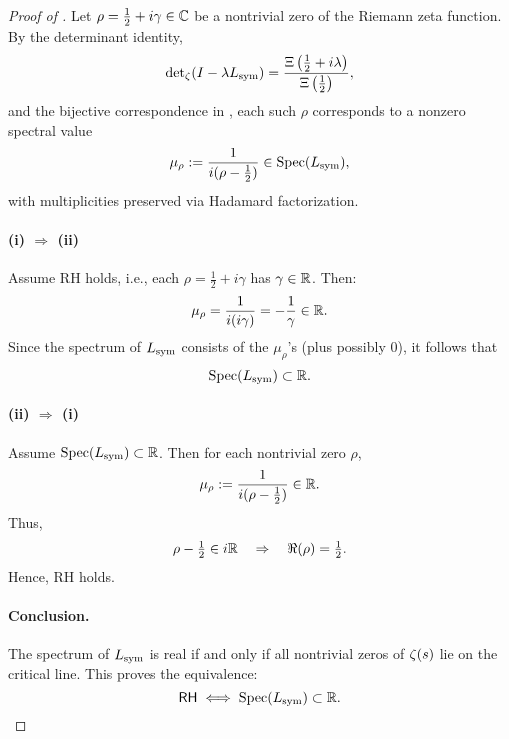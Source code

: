 \begin{proof}[Proof of ]
Let \( \rho = \tfrac{1}{2} + i\gamma \in \mathbb{C} \) be a nontrivial zero of the Riemann zeta function. By the determinant identity,
\[
\det\nolimits_\zeta(I - \lambda L_{\mathrm{sym}}) = \frac{\Xi\left( \tfrac{1}{2} + i\lambda \right)}{\Xi\left( \tfrac{1}{2} \right)},
\]
and the bijective correspondence in , each such \( \rho \) corresponds to a nonzero spectral value
\[
\mu_\rho := \frac{1}{i(\rho - \tfrac{1}{2})} \in \operatorname{Spec}(L_{\mathrm{sym}}),
\]
with multiplicities preserved via Hadamard factorization.

\paragraph{(i) \( \Rightarrow \) (ii)}
Assume RH holds, i.e., each \( \rho = \tfrac{1}{2} + i\gamma \) has \( \gamma \in \mathbb{R} \). Then:
\[
\mu_\rho = \frac{1}{i(i\gamma)} = -\frac{1}{\gamma} \in \mathbb{R}.
\]
Since the spectrum of \( L_{\mathrm{sym}} \) consists of the \( \mu_\rho \)'s (plus possibly 0), it follows that
\[
\operatorname{Spec}(L_{\mathrm{sym}}) \subset \mathbb{R}.
\]

\paragraph{(ii) \( \Rightarrow \) (i)}
Assume \( \operatorname{Spec}(L_{\mathrm{sym}}) \subset \mathbb{R} \). Then for each nontrivial zero \( \rho \),
\[
\mu_\rho := \frac{1}{i(\rho - \tfrac{1}{2})} \in \mathbb{R}.
\]
Thus,
\[
\rho - \tfrac{1}{2} \in i\mathbb{R} \quad \Rightarrow \quad \Re(\rho) = \tfrac{1}{2}.
\]
Hence, RH holds.

\paragraph{Conclusion.}
The spectrum of \( L_{\mathrm{sym}} \) is real if and only if all nontrivial zeros of \( \zeta(s) \) lie on the critical line. This proves the equivalence:
\[
\mathsf{RH} \iff \operatorname{Spec}(L_{\mathrm{sym}}) \subset \mathbb{R}.
\]
\end{proof}

